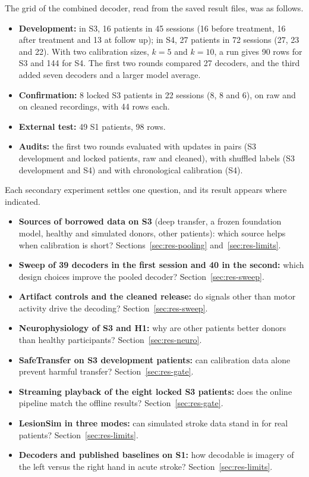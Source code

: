 \documentclass{ieeeaccess}
\begin{document}
The grid of the combined decoder, read from the saved result files, was as follows.
\begin{itemize}
\item \textbf{Development:} in S3, 16 patients in 45 sessions (16 before treatment, 16 after treatment and 13 at follow up); in S4, 27 patients in 72 sessions (27, 23 and 22). With two calibration sizes, $k = 5$ and $k = 10$, a run gives 90 rows for S3 and 144 for S4. The first two rounds compared 27 decoders, and the third added seven decoders and a larger model average.
\item \textbf{Confirmation:} 8 locked S3 patients in 22 sessions (8, 8 and 6), on raw and on cleaned recordings, with 44 rows each.
\item \textbf{External test:} 49 S1 patients, 98 rows.
\item \textbf{Audits:} the first two rounds evaluated with updates in pairs (S3 development and locked patients, raw and cleaned), with shuffled labels (S3 development and S4) and with chronological calibration (S4).
\end{itemize}
Each secondary experiment settles one question, and its result appears where indicated.
\begin{itemize}
\item \textbf{Sources of borrowed data on S3} (deep transfer, a frozen foundation model, healthy and simulated donors, other patients): which source helps when calibration is short? Sections~\ref{sec:res-pooling} and~\ref{sec:res-limits}.
\item \textbf{Sweep of 39 decoders in the first session and 40 in the second:} which design choices improve the pooled decoder? Section~\ref{sec:res-sweep}.
\item \textbf{Artifact controls and the cleaned release:} do signals other than motor activity drive the decoding? Section~\ref{sec:res-sweep}.
\item \textbf{Neurophysiology of S3 and H1:} why are other patients better donors than healthy participants? Section~\ref{sec:res-neuro}.
\item \textbf{SafeTransfer on S3 development patients:} can calibration data alone prevent harmful transfer? Section~\ref{sec:res-gate}.
\item \textbf{Streaming playback of the eight locked S3 patients:} does the online pipeline match the offline results? Section~\ref{sec:res-gate}.
\item \textbf{LesionSim in three modes:} can simulated stroke data stand in for real patients? Section~\ref{sec:res-limits}.
\item \textbf{Decoders and published baselines on S1:} how decodable is imagery of the left versus the right hand in acute stroke? Section~\ref{sec:res-limits}.
\end{itemize}
\end{document}

